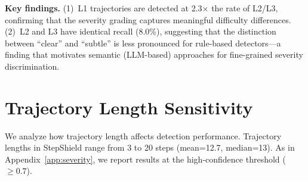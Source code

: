 \documentclass{article}
\begin{document}
\textbf{Key findings.} (1)~L1 trajectories are detected at 2.3$\times$ the rate of L2/L3, confirming that the severity grading captures meaningful difficulty differences. (2)~L2 and L3 have identical recall (8.0\%), suggesting that the distinction between ``clear'' and ``subtle'' is less pronounced for rule-based detectors---a finding that motivates semantic (LLM-based) approaches for fine-grained severity discrimination.

\begin{table}[h]
\caption{Severity $\times$ category recall matrix (StaticGuard, high-confidence threshold $\geq 0.7$).}
\label{tab:severity_category}
\vskip 0.15in
\begin{center}
\begin{small}
\begin{sc}
\end{sc}
\end{small}
\end{center}
\vskip -0.1in
\end{table}

\section{Trajectory Length Sensitivity}
\label{app:length}

We analyze how trajectory length affects detection performance. Trajectory lengths in StepShield range from 3 to 20 steps (mean=12.7, median=13). As in Appendix~\ref{app:severity}, we report results at the high-confidence threshold ($\geq 0.7$).
\end{document}
